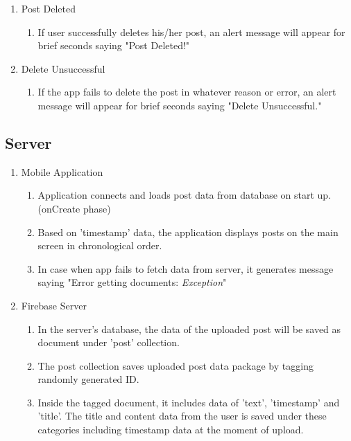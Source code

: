 \documentclass[conference]{IEEEtran}
\numberwithin{figure}{subsection}
\begin{document}
\begin{enumerate}
\begin{enumerate}
            \item Post Deleted
                \begin{enumerate}
                    \item If user successfully deletes his/her post, an alert message will appear for brief seconds saying "Post Deleted!"
                \end{enumerate}
            \item Delete Unsuccessful
                \begin{enumerate}
                    \item If the app fails to delete the post in whatever reason or error, an alert message will appear for brief seconds saying "Delete Unsuccessful."
                \end{enumerate}
        \end{enumerate}
\end{enumerate}

\subsection{\textbf{Server}}
    \begin{enumerate}
        \item Mobile Application
            \begin{enumerate}
                \item Application connects and loads post data from database on start up. (onCreate phase)
                \item Based on 'timestamp' data, the application displays posts on the main screen in chronological order.
                \item In case when app fails to fetch data from server, it generates message saying "Error getting documents: \textit{Exception}"
            \end{enumerate}
        \item Firebase Server
            \begin{enumerate}
                \item In the server's database, the data of the uploaded post will be saved as document under 'post' collection. 
                \item The post collection saves uploaded post data package by tagging randomly generated ID.
                \item Inside the tagged document, it includes data of 'text', 'timestamp' and 'title'. The title and content data from the user is saved under these categories including timestamp data at the moment of upload.
            \end{enumerate}
    \end{enumerate}
\end{document}
